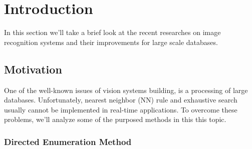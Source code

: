 \chapter{Introduction}

In this section we'll take a brief look at the recent researches on image recognition systems and their improvements for large scale databases.

\section{Motivation}
One of the well-known issues of vision systems building, is a processing of
large databases. Unfortunately, nearest neighbor (NN) rule and exhaustive
search usually cannot be implemented in real-time applications\cite{motiv1}. To overcome these problems, we'll analyze some of the purposed methods in this this topic.

\subsection{Directed Enumeration Method}
